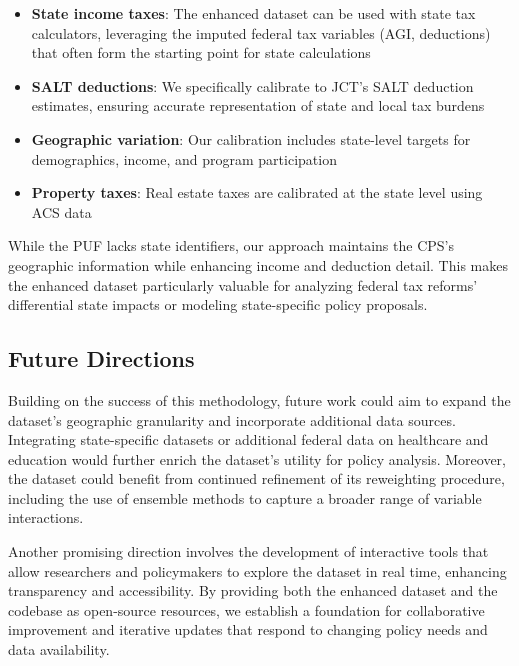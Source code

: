 \begin{itemize}
    \item \textbf{State income taxes}: The enhanced dataset can be used with state tax calculators, leveraging the imputed federal tax variables (AGI, deductions) that often form the starting point for state calculations
    \item \textbf{SALT deductions}: We specifically calibrate to JCT's SALT deduction estimates, ensuring accurate representation of state and local tax burdens
    \item \textbf{Geographic variation}: Our calibration includes state-level targets for demographics, income, and program participation
    \item \textbf{Property taxes}: Real estate taxes are calibrated at the state level using ACS data
\end{itemize}

While the PUF lacks state identifiers, our approach maintains the CPS's geographic information while enhancing income and deduction detail. This makes the enhanced dataset particularly valuable for analyzing federal tax reforms' differential state impacts or modeling state-specific policy proposals.

\subsection{Future Directions}

Building on the success of this methodology, future work could aim to expand the dataset's geographic granularity and incorporate additional data sources. Integrating state-specific datasets or additional federal data on healthcare and education would further enrich the dataset's utility for policy analysis. Moreover, the dataset could benefit from continued refinement of its reweighting procedure, including the use of ensemble methods to capture a broader range of variable interactions.

Another promising direction involves the development of interactive tools that allow researchers and policymakers to explore the dataset in real time, enhancing transparency and accessibility. By providing both the enhanced dataset and the codebase as open-source resources, we establish a foundation for collaborative improvement and iterative updates that respond to changing policy needs and data availability.
